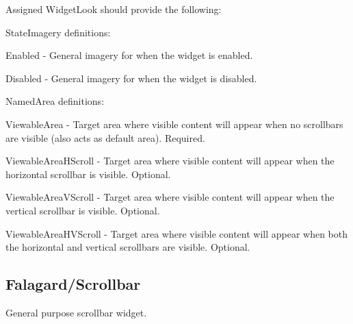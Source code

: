 Assigned Widget\+Look should provide the following\+: 
\begin{DoxyItemize}
\item State\+Imagery definitions\+: 
\begin{DoxyItemize}
\item Enabled -\/ General imagery for when the widget is enabled. 
\item Disabled -\/ General imagery for when the widget is disabled. 
\end{DoxyItemize}


\item Named\+Area definitions\+: 
\begin{DoxyItemize}
\item Viewable\+Area -\/ Target area where visible content will appear when no scrollbars are visible (also acts as default area). Required. 
\item Viewable\+Area\+H\+Scroll -\/ Target area where visible content will appear when the horizontal scrollbar is visible. Optional. 
\item Viewable\+Area\+V\+Scroll -\/ Target area where visible content will appear when the vertical scrollbar is visible. Optional. 
\item Viewable\+Area\+H\+V\+Scroll -\/ Target area where visible content will appear when both the horizontal and vertical scrollbars are visible. Optional. 
\end{DoxyItemize}
\end{DoxyItemize}\hypertarget{fal_wr_ref_fal_wr_ref_sec_18}{}\subsection{Falagard/\+Scrollbar}\label{fal_wr_ref_fal_wr_ref_sec_18}
General purpose scrollbar widget.

